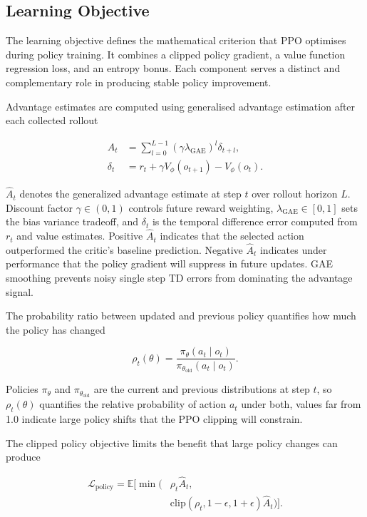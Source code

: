 \documentclass[twocolumn]{article}
\begin{document}
\subsection*{Learning Objective}

The learning objective defines the mathematical criterion that PPO optimises during policy training. It combines a clipped policy gradient, a value function regression loss, and an entropy bonus. Each component serves a distinct and complementary role in producing stable policy improvement.

Advantage estimates are computed using generalised advantage estimation after each collected rollout

\begin{align}
\hat A_t &= \sum_{l=0}^{L-1} (\gamma \lambda_{\mathrm{GAE}})^l \delta_{t+l}, \label{eq:gae}\\
\delta_t &= r_t + \gamma V_{\phi}(o_{t+1}) - V_{\phi}(o_t). \label{eq:td_error}
\end{align}

$\hat A_t$ denotes the generalized advantage estimate at step $t$ over rollout horizon $L$. Discount factor $\gamma \in (0, 1)$ controls future reward weighting, $\lambda_{\mathrm{GAE}} \in [0, 1]$ sets the bias variance tradeoff, and $\delta_t$ is the temporal difference error computed from $r_t$ and value estimates. Positive $\hat A_t$ indicates that the selected action outperformed the critic's baseline prediction. Negative $\hat A_t$ indicates under performance that the policy gradient will suppress in future updates. GAE smoothing prevents noisy single step TD errors from dominating the advantage signal.

The probability ratio between updated and previous policy quantifies how much the policy has changed

\begin{equation}
\rho_t(\theta) = \frac{\pi_{\theta}(a_t \mid o_t)}{\pi_{\theta_{\mathrm{old}}}(a_t \mid o_t)}. \label{eq:ratio}
\end{equation}

Policies $\pi_{\theta}$ and $\pi_{\theta_{\mathrm{old}}}$ are the current and previous distributions at step $t$, so $\rho_t(\theta)$ quantifies the relative probability of action $a_t$ under both, values far from 1.0 indicate large policy shifts that the PPO clipping will constrain.

The clipped policy objective limits the benefit that large policy changes can produce

\begin{equation}
\begin{split}
\mathcal{L}_{\mathrm{policy}} = \mathbb{E} [ \min ( &\rho_t \hat A_t, \\
&\mathrm{clip}(\rho_t, 1 - \epsilon, 1 + \epsilon) \hat A_t ) ].
\end{split}
\label{eq:lpolicy}
\end{equation}
\end{document}

